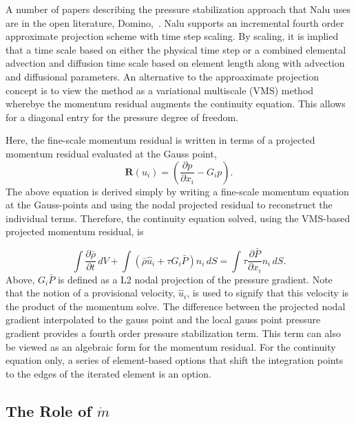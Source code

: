 A number of papers describing the pressure stabilization approach that Nalu uses are in the open literature,
Domino,~\cite{Domino:2006, Domino:2008, Domino:2014}.  Nalu supports an incremental
fourth order approximate projection scheme with time step 
scaling. By scaling, it is implied that a time scale based on either the physical time step or 
a combined elemental advection and diffusion time scale based on element length along
with advection and diffusional parameters. An alternative to the approaximate projection
concept is to view the method as a variational multiscale (VMS) method wherebye the momentum residual
augments the continuity equation. This allows for a diagonal entry for the pressure degree of freedom.

Here, the fine-scale momentum residual is written in terms of a projected momentum residual 
evaluated at the Gauss point,
\begin{equation}
  \mathbf{R}(u_i) = (\frac{\partial p} {\partial x_i} - G_i p ).
\label{fineScaleMomentum}
\end{equation}
The above equation is derived simply by writing a fine-scale momentum equation at the Gauss-points 
and using the nodal projected residual to reconstruct the individual terms.
Therefore, the continuity equation solved, using the VMS-based projected momentum residual, is

\begin{equation}
\int \frac{\partial \bar{\rho}} {\partial t}\, dV
+ \int \left( \bar{\rho} \hat{u}_i + \tau G_i \bar{P} \right) n_i\, dS
  = \int \tau \frac{\partial \bar{P}}{\partial x_i} n_i\, dS.
\end{equation}
%
Above, $G_i \bar{P}$ is defined as a L2 nodal projection of the pressure gradient. Note that the notion of 
a provisional velocity, $\hat u_i$, is used to signify that this velocity is the product of the momentum 
solve. The difference between the projected nodal gradient interpolated to the gauss point and the 
local gauss point pressure gradient provides a fourth order pressure stabilization
term. This term can also be viewed as an algebraic form for the momentum residual. For the continuity
equation only, a series of element-based options that shift the integration points to the edges of the 
iterated element is an option.

\subsection{The Role of $\dot m$}

